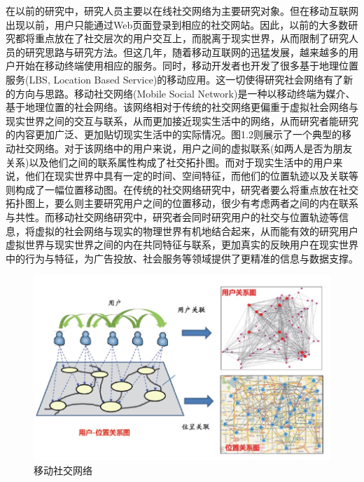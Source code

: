 在以前的研究中，研究人员主要以在线社交网络为主要研究对象。但在移动互联网出现以前，用户只能通过Web页面登录到相应的社交网站。因此，以前的大多数研究都将重点放在了社交层次的用户交互上，而脱离于现实世界，从而限制了研究人员的研究思路与研究方法。但这几年，随着移动互联网的迅猛发展，越来越多的用户开始在移动终端使用相应的服务。同时，移动开发者也开发了很多基于地理位置服务(LBS, Location Based Service)的移动应用。这一切使得研究社会网络有了新的方向与思路。移动社交网络(Mobile Social Network)是一种以移动终端为媒介、基于地理位置的社会网络。该网络相对于传统的社交网络更偏重于虚拟社会网络与现实世界之间的交互与联系，从而更加接近现实生活中的网络，从而研究者能研究的内容更加广泛、更加贴切现实生活中的实际情况。图1.2则展示了一个典型的移动社交网络。对于该网络中的用户来说，用户之间的虚拟联系(如两人是否为朋友关系)以及他们之间的联系属性构成了社交拓扑图。而对于现实生活中的用户来说，他们在现实世界中具有一定的时间、空间特征，而他们的位置轨迹以及关联等则构成了一幅位置移动图。在传统的社交网络研究中，研究者要么将重点放在社交拓扑图上，要么则主要研究用户之间的位置移动，很少有考虑两者之间的内在联系与共性。而移动社交网络研究中，研究者会同时研究用户的社交与位置轨迹等信息，将虚拟的社会网络与现实的物理世界有机地结合起来，从而能有效的研究用户虚拟世界与现实世界之间的内在共同特征与联系，更加真实的反映用户在现实世界中的行为与特征，为广告投放、社会服务等领域提供了更精准的信息与数据支撑。

\begin{figure}[!ht]
	\centering
	\includegraphics[]{figure/msn.png}
	\caption{移动社交网络}
	\label{fig-msn}
\end{figure}


